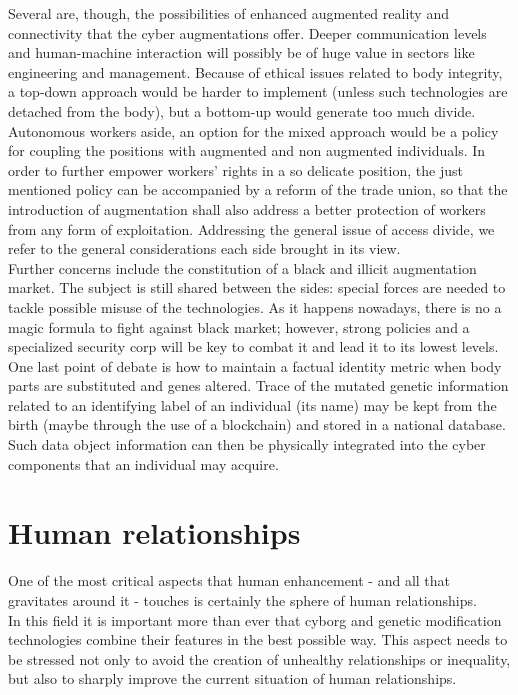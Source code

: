 Several are, though, the possibilities of enhanced augmented reality and connectivity that the cyber augmentations offer. Deeper communication levels and human-machine interaction will possibly be of huge value in sectors like engineering and management. Because of ethical issues related to body integrity, a top-down approach would be harder to implement (unless such technologies are detached from the body), but a bottom-up would generate too much divide. Autonomous workers aside, an option for the mixed approach would be a policy for coupling the positions with augmented and non augmented individuals. In order to further empower workers’ rights in a so delicate position, the just mentioned policy can be accompanied by a reform of the trade union, so that the introduction of augmentation shall also address a better protection of workers from any form of exploitation. Addressing the general issue of access divide, we refer to the general considerations each side brought in its view.\\

Further concerns include the constitution of a black and illicit augmentation market. The subject is still shared between the sides: special forces are needed to tackle possible misuse of the technologies. As it happens nowadays, there is no a magic formula to fight against black market; however, strong policies and a specialized security corp will be key to combat it and lead it to its lowest levels. \\

One last point of debate is how to maintain a factual identity metric when body parts are substituted and genes altered. Trace of the mutated genetic information related to an identifying label of an individual (its name) may be kept from the birth (maybe through the use of a blockchain) and stored in a national database. Such data object information can then be physically integrated into the cyber components that an individual may acquire.


\section*{Human relationships}
\label{sec:relationships}

One of the most critical aspects that human enhancement - and all that gravitates around it - touches is certainly the sphere of human relationships. \\

In this field it is important more than ever that cyborg and genetic modification technologies combine their features in the best possible way. This aspect needs to be stressed not only to avoid the creation of unhealthy relationships or inequality, but also to sharply improve the current situation of human relationships.

